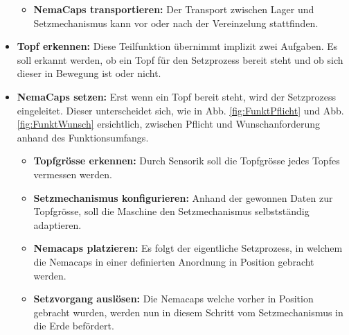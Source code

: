\begin{itemize}
\begin{itemize}
		\item \textbf{NemaCaps transportieren:} Der Transport zwischen Lager und Setzmechanismus kann vor oder nach der Vereinzelung stattfinden.
	\end{itemize}

	\item \textbf{Topf erkennen:} Diese Teilfunktion übernimmt implizit zwei Aufgaben. Es soll erkannt werden, ob ein Topf für den Setzprozess bereit steht und ob sich dieser in Bewegung ist oder nicht. 
	
	\item \textbf{NemaCaps setzen:} Erst wenn ein Topf bereit steht, wird der Setzprozess eingeleitet. Dieser unterscheidet sich, wie in Abb. \ref{fig:FunktPflicht} und Abb. \ref{fig:FunktWunsch} ersichtlich, zwischen Pflicht und Wunschanforderung anhand des Funktionsumfangs.
	
	\begin{itemize}
		\item \textbf{Topfgrösse erkennen:} Durch Sensorik soll die Topfgrösse jedes Topfes vermessen werden.
		
		\item \textbf{Setzmechanismus konfigurieren:} Anhand der gewonnen Daten zur Topfgrösse, soll die Maschine den Setzmechanismus selbstständig adaptieren.
		
		\item \textbf{Nemacaps platzieren:} Es folgt der eigentliche Setzprozess, in welchem die Nemacaps in einer definierten Anordnung in Position gebracht werden.
		
		\item \textbf{Setzvorgang auslösen:} Die Nemacaps welche vorher in Position gebracht wurden, werden nun in diesem Schritt vom Setzmechanismus in die Erde befördert.
	\end{itemize}
	
\end{itemize}
